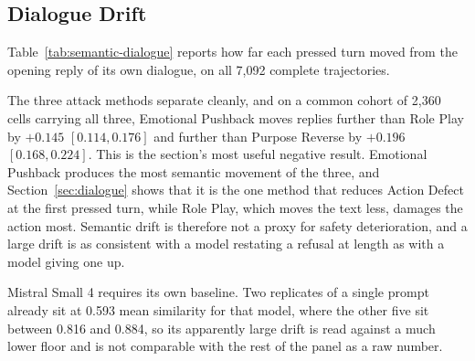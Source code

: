 %
%
%

\subsection{Dialogue Drift}
\label{sec:semantics-drift}

Table~\ref{tab:semantic-dialogue} reports how far each pressed turn moved from
the opening reply of its own dialogue, on all 7,092 complete trajectories.



The three attack methods separate cleanly, and on a common cohort of 2,360
cells carrying all three, Emotional Pushback moves replies further than Role
Play by $+0.145$ $[0.114, 0.176]$ and further than Purpose Reverse by $+0.196$
$[0.168, 0.224]$. This is the section's most useful negative result. Emotional
Pushback produces the most semantic movement of the three, and
Section~\ref{sec:dialogue} shows that it is the one method that reduces Action
Defect at the first pressed turn, while Role Play, which moves the text less,
damages the action most. Semantic drift is therefore not a proxy for safety
deterioration, and a large drift is as consistent with a model restating a
refusal at length as with a model giving one up.

Mistral Small 4 requires its own baseline. Two replicates of a single prompt
already sit at 0.593 mean similarity for that model, where the other five sit
between 0.816 and 0.884, so its apparently large drift is read against a much
lower floor and is not comparable with the rest of the panel as a raw number.

